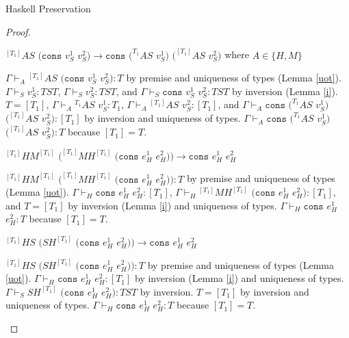 \begin{theorem}{Haskell Preservation}
\begin{proof}

\begin{case}
$^{[T_{1}]}AS$ $(\mathtt{cons}$ $v_{S}^{1}$ $v_{S}^{2})\rightarrow\mathtt{cons}$ $(^{T_{1}}AS$ $v_{S}^{1})$ $(^{[T_{1}]}AS$ $v_{S}^{2})$ where $A\in\lbrace H,M\rbrace$

$\Gamma\vdash_{A}{^{[T_{1}]}A}S$ $(\mathtt{cons}$ $v_{S}^{1}$ $v_{S}^{2}):T$ by premise and uniqueness of types (Lemma \ref{uot}).  $\Gamma\vdash_{S}v_{S}^{1}:TST$, $\Gamma\vdash_{S}v_{S}^{2}:TST$, and $\Gamma\vdash_{S}\mathtt{cons}$ $v_{S}^{1}$ $v_{S}^{2}:TST$ by inversion (Lemma \ref{i}).  $T=[T_{1}]$, $\Gamma\vdash_{A}{^{T_{1}}A}S$ $v_{S}^{1}:T_{1}$, $\Gamma\vdash_{A}{^{[T_{1}]}A}S$ $v_{S}^{2}:[T_{1}]$, and $\Gamma\vdash_{A}\mathtt{cons}$ $(^{T_{1}}AS$ $v_{S}^{1})$ $(^{[T_{1}]}AS$ $v_{S}^{2}):[T_{1}]$ by inversion and uniqueness of types.  $\Gamma\vdash_{A}\mathtt{cons}$ $(^{T_{1}}AS$ $v_{S}^{1})$ $(^{[T_{1}]}AS$ $v_{S}^{2}):T$ because $[T_{1}]=T$.
\end{case}


\begin{case}
$^{[T_{1}]}HM^{[T_{1}]}$ $(^{[T_{1}]}MH^{[T_{1}]}$ $(\mathtt{cons}$ $e_{H}^{1}$ $e_{H}^{2}))\rightarrow\mathtt{cons}$ $e_{H}^{1}$ $e_{H}^{2}$

$^{[T_{1}]}HM^{[T_{1}]}$ $(^{[T_{1}]}MH^{[T_{1}]}$ $(\mathtt{cons}$ $e_{H}^{1}$ $e_{H}^{2})):T$ by premise and uniqueness of types (Lemma \ref{uot}).  $\Gamma\vdash_{H}\mathtt{cons}$ $e_{H}^{1}$ $e_{H}^{2}:[T_{1}]$, $\Gamma\vdash_{H}{^{[T_{1}]}M}H^{[T_{1}]}$ $(\mathtt{cons}$ $e_{H}^{1}$ $e_{H}^{2}):[T_{1}]$, and $T=[T_{1}]$ by inversion (Lemma \ref{i}) and uniqueness of types.  $\Gamma\vdash_{H}\mathtt{cons}$ $e_{H}^{1}$ $e_{H}^{2}:T$ because $[T_{1}]=T$.
\end{case}


\begin{case}
$^{[T_{1}]}HS$ $(SH^{[T_{1}]}$ $(\mathtt{cons}$ $e_{H}^{1}$ $e_{H}^{2}))\rightarrow\mathtt{cons}$ $e_{H}^{1}$ $e_{H}^{2}$

$^{[T_{1}]}HS$ $(SH^{[T_{1}]}$ $(\mathtt{cons}$ $e_{H}^{1}$ $e_{H}^{2})):T$ by premise and uniqueness of types (Lemma \ref{uot}).  $\Gamma\vdash_{H}\mathtt{cons}$ $e_{H}^{1}$ $e_{H}^{2}:[T_{1}]$ by inversion (Lemma \ref{i}) and uniqueness of types.  $\Gamma\vdash_{S}SH^{[T_{1}]}$ $(\mathtt{cons}$ $e_{H}^{1}$ $e_{H}^{2}):TST$ by inversion.  $T=[T_{1}]$ by inversion and uniqueness of types.  $\Gamma\vdash_{H}\mathtt{cons}$ $e_{H}^{1}$ $e_{H}^{2}:T$ because $[T_{1}]=T$.
\end{case}


\end{proof}
\end{theorem}
